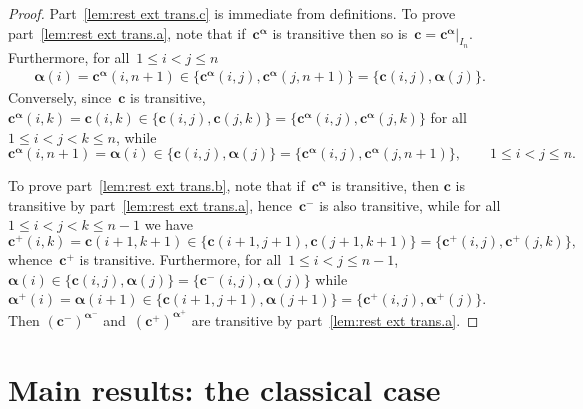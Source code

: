 \documentclass[12pt, reqno]{amsart}
\theoremstyle{definition}
\numberwithin{equation}{section}
\begin{document}
\begin{proof}
Part~\ref{lem:rest ext trans.c} is immediate from definitions.
To prove part~\ref{lem:rest ext trans.a}, note that
if~$\mathbf c^{\boldsymbol\alpha}$ is transitive then so is~$\mathbf c=\mathbf c^{\boldsymbol\alpha}|_{I_n}$. Furthermore, for all~$1\le i<j\le n$
\begin{align*}
\boldsymbol\alpha(i)=\mathbf c^{\boldsymbol{\alpha}}(i,n+1)\in \{ \mathbf c^{\boldsymbol{\alpha}}(i,j),
\mathbf c^{\boldsymbol{\alpha}}(j,n+1)\}=\{\mathbf c(i,j),\boldsymbol{\alpha}(j)\}.
\end{align*}
Conversely, since~$\mathbf c$ is transitive, $\mathbf c^{\boldsymbol\alpha}(i,k)=
\mathbf c(i,k)\in \{\mathbf c(i,j),\mathbf c(j,k)\}=
\{\mathbf c^{\boldsymbol\alpha}(i,j),\mathbf c^{\boldsymbol\alpha}(j,k)\}$ for 
all~$1\le i<j<k\le n$, while 
$$
\mathbf c^{\boldsymbol\alpha}(i,n+1)=\boldsymbol{\alpha}(i)\in\{\mathbf c(i,j),
\boldsymbol{\alpha}(j)\}
=\{\mathbf c^{\boldsymbol{\alpha}}(i,j),\mathbf c^{\boldsymbol{\alpha}}(j,n+1)\},
\qquad 1\le i<j\le n.
$$

To prove part~\ref{lem:rest ext trans.b}, note that if~$\mathbf c^{\boldsymbol{\alpha}}$ is transitive, then $\mathbf c$ is transitive by part~\ref{lem:rest ext trans.a}, hence~$\mathbf c^-$ is also transitive, while for all $1\le i<j<k\le n-1$ we have 
$$
\mathbf c^+(i,k)=\mathbf c(i+1,k+1)\in \{\mathbf c(i+1,j+1),\mathbf c(j+1,k+1)\}=
\{\mathbf c^+(i,j),\mathbf c^+(j,k)\},
$$
whence~$\mathbf c^+$ is transitive. 
Furthermore,  for all~$1\le i<j\le n-1$,
$\boldsymbol{\alpha}(i)\in\{\mathbf c(i,j),\boldsymbol{\alpha}(j)\}=\{\mathbf c^-(i,j),\boldsymbol{\alpha}(j)\}$ while $\boldsymbol\alpha^+(i)=\boldsymbol{\alpha}(i+1)\in\{\mathbf c(i+1,j+1),\boldsymbol{\alpha}(j+1)\}=\{\mathbf c^+(i,j),\boldsymbol\alpha^+(j)\}$. 
Then $(\mathbf c^-)^{\boldsymbol{\alpha}^-}$ and~$(\mathbf c^+)^{\boldsymbol{\alpha}^+}$ are transitive by part~\ref{lem:rest ext trans.a}.
\end{proof}

\section{Main results: the classical case}\label{sect:main classical}
\end{document}
